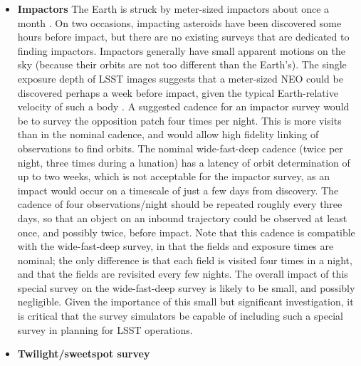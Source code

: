 \begin{itemize}
\item{{\bf Impactors}}
The Earth is struck by meter-sized impactors about
once a month \citep[\eg][Trilling  submitted]{Boslough2015, 2017Icar..284..416T}.
On two occasions, impacting asteroids have
been discovered some hours before impact, but
there are no existing surveys that are dedicated to finding
impactors.
Impactors generally have small apparent motions
on the sky (because their orbits are not too different
than the Earth's). The single exposure depth of LSST
images suggests that a meter-sized NEO could be
discovered perhaps a week before impact, given
the typical Earth-relative velocity of such a body
\citep[\eg][]{2017arXiv170506209C}.
A suggested cadence for an impactor survey would be
to survey the opposition patch four times per night.
This is more visits than in the nominal cadence, and
would allow high fidelity linking of observations to
find orbits. The nominal wide-fast-deep cadence
(twice per night, three times during a lunation) has
a latency of orbit determination of up to two weeks,
which is not acceptable for the impactor survey, as an
impact would occur on a timescale of just a few days
from discovery.
The cadence of four observations/night should be repeated
roughly every three days, so that an object on an
inbound trajectory could be observed at least once,
and possibly twice, before impact.
Note that this cadence is compatible with
the wide-fast-deep survey, in that the fields and
exposure times are nominal; the only difference is that
each field is visited four times in a night, and that
the fields are revisited every few nights. The overall
impact of this special survey on the wide-fast-deep
survey is likely to be small, and possibly negligible.
Given the importance of this small but
significant investigation, it is critical that the
survey simulators be capable of including such
a special survey in planning for LSST operations.

\item{{\bf Twilight/sweetspot survey}}


\end{itemize}
